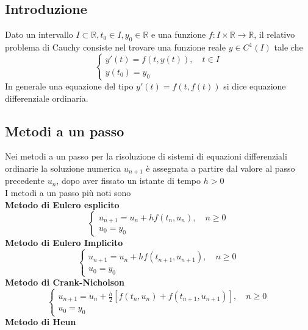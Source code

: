\documentclass[a4paper,12pt]{article}
\begin{document}
\subsection{Introduzione}
Dato un intervallo $I \subset \mathbb{R}, t_0 \in I, y_0 \in \mathbb{R}$ e una funzione $f : I \times \mathbb{R} \rightarrow \mathbb{R}$, il relativo problema di Cauchy consiste nel trovare una funzione reale $y \in C^1(I)$ tale che 
$$
\begin{cases}
y'(t) = f(t,y(t)), \quad t\in I \\
y(t_0)=y_0
\end{cases}
$$
In generale una equazione del tipo $y'(t) = f(t, f(t))$ si dice equazione differenziale ordinaria. \\
\subsection{Metodi a un passo}
Nei metodi a un passo per la risoluzione di sistemi di equazioni differenziali ordinarie la soluzione numerica $u_{n+1}$ è assegnata a partire dal valore al passo precedente $u_n$, dopo aver fissato un istante di tempo $h > 0$\\
I metodi a un passo più noti sono \\
\textbf{Metodo di Eulero esplicito} \\
$$
\begin{cases}
u_{n+1} = u_n + hf(t_n, u_n), \quad n\geq 0 \\
u_0 = y_0
\end{cases}
$$
\textbf{Metodo di Eulero Implicito} \\
$$
\begin{cases}
u_{n+1} = u_n + hf(t_{n+1}, u_{n+1}), \quad n\geq 0 \\
u_0 = y_0
\end{cases}
$$
\textbf{Metodo di Crank-Nicholson} \\
$$
\begin{cases}
u_{n+1} = u_n + \frac{h}{2}[f(t_n, u_n)+f(t_{n+1}, u_{n+1})], \quad n\geq 0 \\
u_0 = y_0
\end{cases}
$$
\textbf{Metodo di Heun} \\
\end{document}
